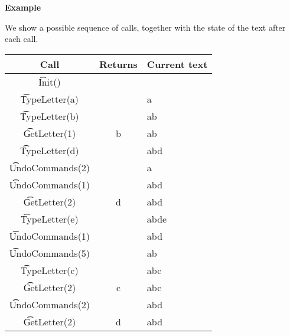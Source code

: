 \bf{Example}

We show a possible sequence of calls, together with the state of the text after each call. 

\begin{tabular}{|c|c|l|}\hline
\bf{Call}&\bf{Returns}&\bf{Current text}\\\hline
\t{Init()}&&\\\hline
\t{TypeLetter(a)}& &a\\\hline
\t{TypeLetter(b)}& &ab\\\hline
\t{GetLetter(1)}& b &ab\\\hline
\t{TypeLetter(d)}& &abd\\\hline
\t{UndoCommands(2)}& &a\\\hline
\t{UndoCommands(1)}& &abd\\\hline
\t{GetLetter(2)}& d &abd\\\hline
\t{TypeLetter(e)}& &abde\\\hline
\t{UndoCommands(1)}& &abd\\\hline
\t{UndoCommands(5)}& &ab\\\hline
\t{TypeLetter(c)}& &abc\\\hline
\t{GetLetter(2)}& c &abc\\\hline
\t{UndoCommands(2)}& &abd\\\hline
\t{GetLetter(2)}& d &abd\\\hline
\end{tabular}

